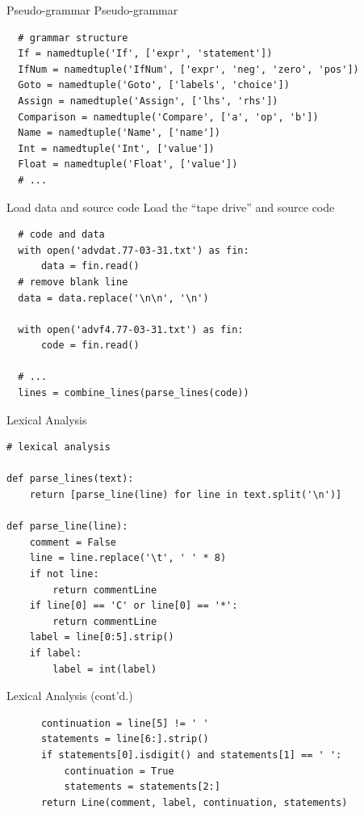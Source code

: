 \documentclass{beamer}
\def\py{
  \lstset{
     language=Python,
     extendedchars=true,
     basicstyle=\footnotesize\ttfamily,
     showstringspaces=false,
     showspaces=false,
     numbersep=9pt,
     tabsize=2,
     breaklines=true,
     showtabs=false,
     captionpos=b
  }
}
\begin{document}
\begin{frame}[fragile]{Pseudo-grammar}
Pseudo-grammar

\py
\begin{lstlisting}
  # grammar structure
  If = namedtuple('If', ['expr', 'statement'])
  IfNum = namedtuple('IfNum', ['expr', 'neg', 'zero', 'pos'])
  Goto = namedtuple('Goto', ['labels', 'choice'])
  Assign = namedtuple('Assign', ['lhs', 'rhs'])
  Comparison = namedtuple('Compare', ['a', 'op', 'b'])
  Name = namedtuple('Name', ['name'])
  Int = namedtuple('Int', ['value'])
  Float = namedtuple('Float', ['value'])
  # ...
\end{lstlisting}
\end{frame}

\begin{frame}[fragile]{Load data and source code}
Load the ``tape drive'' and source code

\py
\begin{lstlisting}
  # code and data
  with open('advdat.77-03-31.txt') as fin:
      data = fin.read()
  # remove blank line
  data = data.replace('\n\n', '\n')

  with open('advf4.77-03-31.txt') as fin:
      code = fin.read()

  # ...
  lines = combine_lines(parse_lines(code))
\end{lstlisting}
\end{frame}

\begin{frame}[fragile]{Lexical Analysis}
\py
\begin{lstlisting}
# lexical analysis

def parse_lines(text):
    return [parse_line(line) for line in text.split('\n')]

def parse_line(line):
    comment = False
    line = line.replace('\t', ' ' * 8)
    if not line:
        return commentLine
    if line[0] == 'C' or line[0] == '*':
        return commentLine
    label = line[0:5].strip()
    if label:
        label = int(label)
\end{lstlisting}
\end{frame}

\begin{frame}[fragile]{Lexical Analysis (cont'd.)}
\py
\begin{lstlisting}
      continuation = line[5] != ' '
      statements = line[6:].strip()
      if statements[0].isdigit() and statements[1] == ' ':
          continuation = True
          statements = statements[2:]
      return Line(comment, label, continuation, statements)
\end{lstlisting}
\end{frame}
\end{document}
